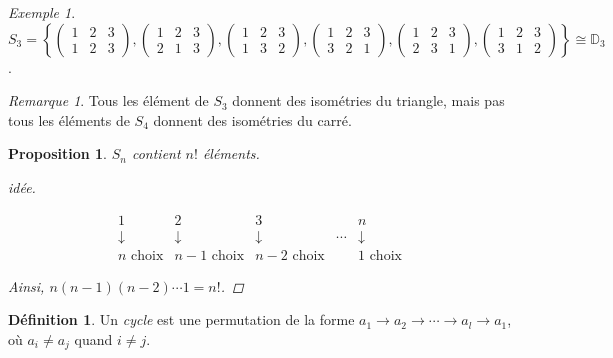 \documentclass{report}
\newtheorem*{prop}{Proposition}
\theoremstyle{definition}
\newtheorem*{defin}{D\'efinition}
\theoremstyle{remark}
\newtheorem*{exem}{Exemple}
\newtheorem*{rema}{Remarque}
\newenvironment*{subsubproof}[1][D\'emonstration]
{
\begin{proof}[#1]
}
{
	\renewcommand{\qedsymbol}{$\#$}
\end{proof}
\renewcommand{\qedsymbol}{$\blacksquare$}
}
\begin{document}
\begin{exem}
		$S_3 = \left\lbrace \begin{pmatrix}
			1&2&3\\1&2&3
		\end{pmatrix}, \begin{pmatrix}
			1&2&3\\2&1&3
		\end{pmatrix}, \begin{pmatrix}
			1&2&3\\1&3&2
		\end{pmatrix}, \begin{pmatrix}
			1&2&3\\3&2&1
		\end{pmatrix}, \begin{pmatrix}
			1&2&3\\2&3&1
		\end{pmatrix}, \begin{pmatrix}
			1&2&3\\3&1&2
		\end{pmatrix} \right\rbrace \cong \mathbb{D}_3$.
	\end{exem}
	\begin{rema}
		Tous les \'el\'ement de $S_3$ donnent des isom\'etries du triangle, mais pas tous les \'el\'ements de $S_4$ donnent des isom\'etries du carr\'e.
	\end{rema}
	\begin{prop}
		$S_n$ contient $n!$ \'el\'ements.
		\begin{subsubproof}[id\'ee]~

			\[
			\begin{matrix}
				1&2&3&&n\\
				\downarrow&\downarrow&\downarrow&\dotsb&\downarrow\\
				n\text{ choix}&n-1\text{ choix}&n-2\text{ choix}&&1\text{ choix}
			\end{matrix}
			\]

			Ainsi, $n(n-1)(n-2)\dotsb1 = n!$.
		\end{subsubproof}
	\end{prop}
	\begin{defin}
		Un \emph{cycle} est une permutation de la forme $a_1 \to a_2 \to \dotsb \to a_l \to a_1$, o\`u $a_i \neq a_j$ quand $i \neq j$.
		\begin{center}
		\end{center}
	\end{defin}
\end{document}
